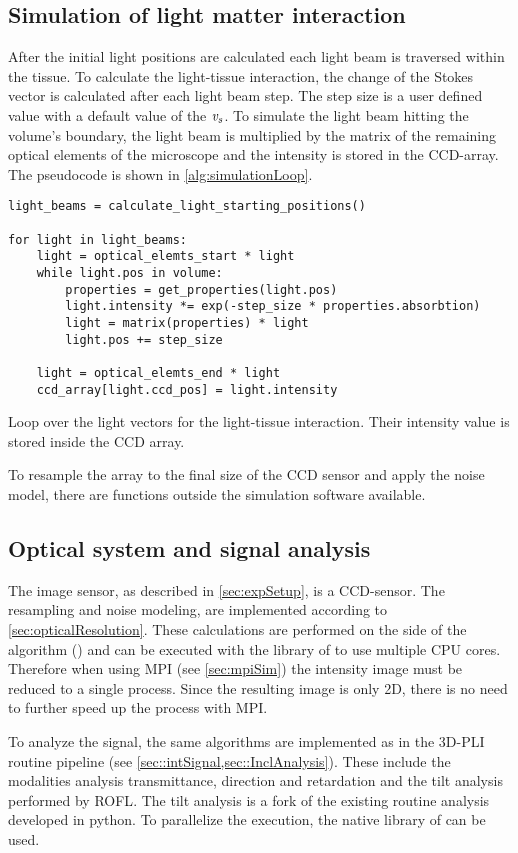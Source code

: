 \subsection{Simulation of light matter interaction}\label{sec:simLightTissue}
%
After the initial light positions are calculated each light beam is traversed within the tissue.
To calculate the light-tissue interaction, the change of the Stokes vector is calculated after each light beam step.
The step size is a user defined value with a default value of the \Voxelsize{} $\textnormal{$\mathit{v_{s}}$}$.
To simulate the light beam hitting the volume's boundary, the light beam is multiplied by the matrix of the remaining optical elements of the microscope and the intensity is stored in the \ac{CCD}-array.
The pseudocode is shown in \cref{alg:simulationLoop}.
%
\begin{lstfloat}[!tb]
\lstset{style=python}
\begin{lstlisting}[]
light_beams = calculate_light_starting_positions()

for light in light_beams:
    light = optical_elemts_start * light
    while light.pos in volume:
        properties = get_properties(light.pos)
        light.intensity *= exp(-step_size * properties.absorbtion)
        light = matrix(properties) * light
        light.pos += step_size
   
    light = optical_elemts_end * light
    ccd_array[light.ccd_pos] = light.intensity
\end{lstlisting}
\caption{Loop over the light vectors for the light-tissue interaction. Their intensity value is stored inside the \ac{CCD} array.}
\label{alg:simulationLoop}
\end{lstfloat}
%
To resample the array to the final size of the \ac{CCD} sensor and apply the noise model, there are \python{} functions outside the simulation software available.
% 
% 
%
\subsection{Optical system and signal analysis}
\label{sec:ccdOptic}
%
The image sensor, as described in \cref{sec:expSetup}, is a \ac{CCD}-sensor.
The resampling and noise modeling, are implemented according to \cref{sec:opticalResolution}.
These calculations are performed on the \python{} side of the algorithm () and can be executed with the  library of \python{} to use multiple \ac{CPU} cores.
Therefore when using \ac{MPI} (see \cref{sec:mpiSim}) the intensity image must be reduced to a single process.
Since the resulting image is only 2D, there is no need to further speed up the process with \ac{MPI}.
\par
%
To analyze the signal, the same algorithms are implemented as in the \ac{3D-PLI} routine pipeline (see \cref{sec::intSignal,sec::InclAnalysis}).
These include the modalities analysis transmittance, direction and retardation and the tilt analysis performed by \ac{ROFL}.
The tilt analysis is a fork of the existing routine analysis developed in python.
To parallelize the execution, the native  library of \python{} can be used.
% 
% 
%
